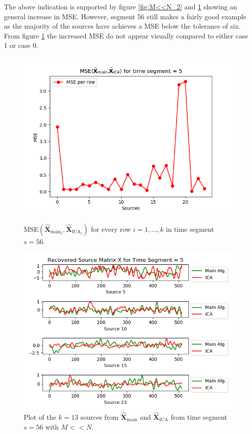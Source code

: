 \noindent 
The above indication is supported by figure \ref{fig:M<<N_2} and \ref{fig:M<<N_3} showing an general increase in MSE. 
However, segment 56 still makes a fairly good example as the majority of the sources have achieves a MSE below the tolerance of six. 
From figure \ref{fig:M<<N_3} the increased MSE do not appear visually compared to either case 1 or case 0.        
\begin{figure}[H]
\begin{widepage}
    \begin{minipage}[t]{.49\textwidth}
\centering
\includegraphics[width=1\linewidth]{figures/ch_7/resultat/mse_second_removed_ica_timeseg5.png}
\caption{MSE$\left(\hat{\mathbf{X}}_{\text{main}_{i}},\hat{\mathbf{X}}_{\text{ICA}_{i}}\right)$ for every row $i = 1, \dots, k$ in time segment $s = 56$.}
\label{fig:M<<N_2}
\end{minipage} 
\hspace{.5cm}
\begin{minipage}[t]{.49\textwidth}
\centering
\includegraphics[width=1\linewidth]{figures/ch_7/resultat/EEG_second_removed_scaled_timeseg5S1_CClean.png}
\caption{Plot of the $k = 13$ sources from $\hat{\mathbf{X}}_{\text{main}}$ and $\hat{\mathbf{X}}_{\text{ICA}}$ from time segment $s = 56$ with $M << N$.}
	\label{fig:M<<N_3}
    \end{minipage}
\end{widepage}
\end{figure}

